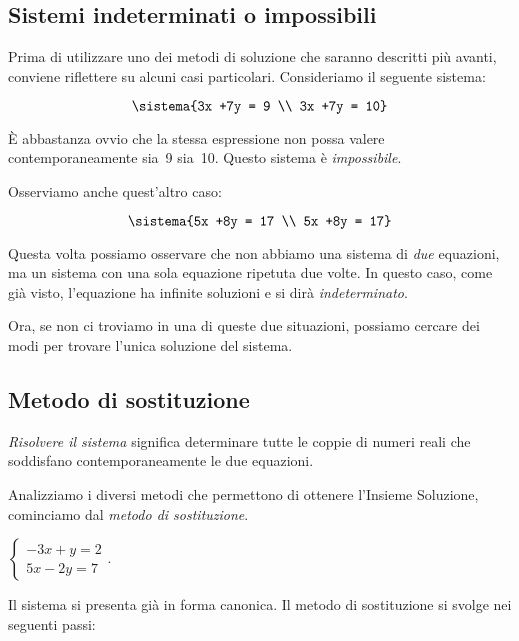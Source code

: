 \subsection{Sistemi indeterminati o impossibili}

Prima di utilizzare uno dei metodi di soluzione che saranno descritti più 
avanti, conviene riflettere su alcuni casi particolari. Consideriamo il 
seguente sistema:

\[\sistema{3x +7y = 9 \\ 3x +7y = 10}\]

È abbastanza ovvio che la stessa espressione non possa valere 
contemporaneamente sia~9 sia~10. Questo sistema è \emph{impossibile}.

Osserviamo anche quest'altro caso:

\[\sistema{5x +8y = 17 \\ 5x +8y = 17}\]

Questa volta possiamo osservare che non abbiamo una sistema di \emph{due} 
equazioni, ma un sistema con una sola equazione ripetuta due volte. In questo 
caso, come già visto, l'equazione ha infinite soluzioni e si dirà 
\emph{indeterminato}.

Ora, se non ci troviamo in una di queste due situazioni, possiamo cercare dei 
modi per trovare l'unica soluzione del sistema.

\subsection{Metodo di sostituzione}
\emph{Risolvere il sistema} significa determinare tutte le coppie di
numeri reali che soddisfano contemporaneamente le due equazioni.

Analizziamo i diversi metodi che permettono di ottenere
l'Insieme Soluzione, cominciamo dal \emph{metodo di sostituzione}.

\begin{esempio}
\(\left\{\begin{array}{l}-3x+y=2\\5x-2y=7\end{array}\right.\).
\end{esempio}

Il sistema si presenta già in forma canonica. Il metodo di
sostituzione si svolge nei seguenti passi:


